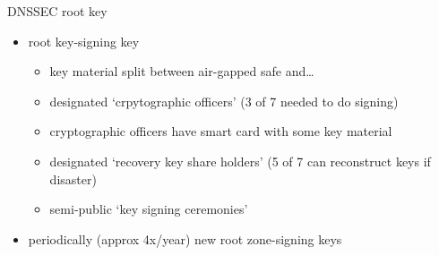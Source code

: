 \begin{frame}{DNSSEC root key}
    \begin{itemize}
    \item root key-signing key
        \begin{itemize}
        \item key material split between air-gapped safe and\ldots
        \item designated `crpytographic officers' (3 of 7 needed to do signing)
        \item cryptographic officers have smart card with some key material
        \vspace{.5cm}
        \item designated `recovery key share holders' (5 of 7 can reconstruct keys if disaster)
        \item semi-public `key signing ceremonies'
        \end{itemize}
    \item periodically (approx 4x/year) new root zone-signing keys
    \end{itemize}
\end{frame}
